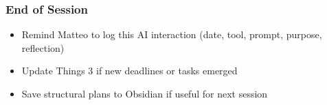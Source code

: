 \subsubsection{End of Session}

\begin{itemize}[label={\framebox[1.4ex]{\rule{0pt}{1.1ex}}}]
  \item Remind Matteo to log this AI interaction (date, tool, prompt, purpose,
        reflection)
  \item Update Things 3 if new deadlines or tasks emerged
  \item Save structural plans to Obsidian if useful for next session
\end{itemize}
